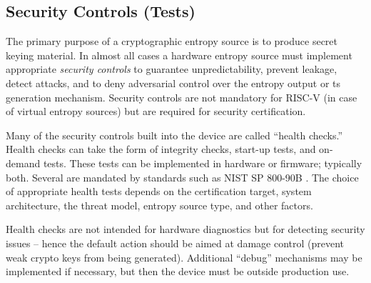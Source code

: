 \subsection{Security Controls (Tests)}
\label{sec:security-controls}

    The primary purpose of a cryptographic entropy source is to produce
    secret keying material. In almost all cases a hardware entropy source
    must implement appropriate \emph{security controls} to guarantee
    unpredictability, prevent leakage, detect attacks, and to deny
    adversarial control over the entropy output or ts generation mechanism.
    Security controls are not mandatory for RISC-V (in case of virtual
    entropy sources) but are required for security certification.

    Many of the security controls built into the device are called ``health
    checks.'' Health checks can take the form of integrity checks, start-up
    tests, and on-demand tests. These tests can be implemented in hardware
    or firmware; typically both. Several are mandated by standards such as
    NIST SP 800-90B \cite{NI19}. The choice of appropriate health tests
    depends on the certification target, system architecture, the threat
    model, entropy source type, and other factors.

    Health checks are not intended for hardware diagnostics but for
    detecting security issues -- hence the default action should be aimed
    at damage control (prevent weak crypto keys from being
    generated). Additional ``debug'' mechanisms may be implemented if
    necessary, but then the device must be outside production use.

